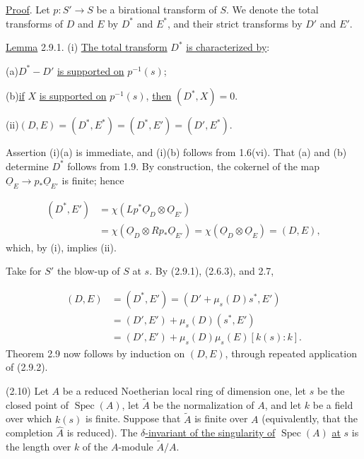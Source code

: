 \underline{Proof}. Let $p:S'\longrightarrow S$ be a birational transform of $S$.
We denote the total transforms of $D$ and $E$ by $D^*$ and $E^*$, and their
strict transforms by $D'$ and $E'$.


\underline{Lemma} 2.9.1. (i) \underline{The total transform} $D^*$
\underline{is characterized by}:

(a)\quad $D^*-D'$ \underline{is supported on} $p^{-1}(s)$;

(b)\quad \underline{if} $X$ \underline{is supported on} $p^{-1}(s)$,
\underline{then} $(D^*,X)=0$.

(ii)\quad $(D,E)=(D^*,E^*)=(D^*,E')=(D',E^*)$.

Assertion (i)(a) is immediate, and (i)(b) follows from 1.6(vi).  That (a) and (b)
determine $D^*$ follows from 1.9.  By construction, the cokernel of the map
$\underline{O}_E\longrightarrow p_*\underline{O}_{E'}$ is finite; hence

\begin{equation*}
\begin{aligned}
(D^*,E')
&=\chi(Lp^*\underline{O}_D\otimes\underline{O}_{E'})\\
&=\chi(\underline{O}_D\otimes Rp_*\underline{O}_{E'})
=\chi(\underline{O}_D\otimes\underline{O}_E)
=(D,E),
\end{aligned}
\end{equation*}
which, by (i), implies (ii).

Take for $S'$ the blow-up of $S$ at $s$.  By (2.9.1), (2.6.3), and 2.7,

\begin{equation}\tag{2.9.2}
\begin{aligned}
(D,E)
&=(D^*,E')
=(D'+\mu_s(D)s^*,E')\\
&=(D',E')+\mu_s(D)(s^*,E')\\
&=(D',E')+\mu_s(D)\mu_s(E)[k(s):k].
\end{aligned}
\end{equation}
Theorem 2.9 now follows by induction on $(D,E)$, through repeated application of
(2.9.2).

(2.10) Let $A$ be a reduced Noetherian local ring of dimension one, let $s$ be the
closed point of $\operatorname{Spec}(A)$, let $\widetilde A$ be the normalization
of $A$, and let $k$ be a field over which $k(s)$ is finite.  Suppose that
$\widetilde A$ is finite over $A$ (equivalently, that the completion $\widehat A$
is reduced).  The \underline{$\delta$-invariant of the singularity of}
$\operatorname{Spec}(A)$ \underline{at} $s$ is the length over $k$ of the
$A$-module $\widetilde A/A$.

